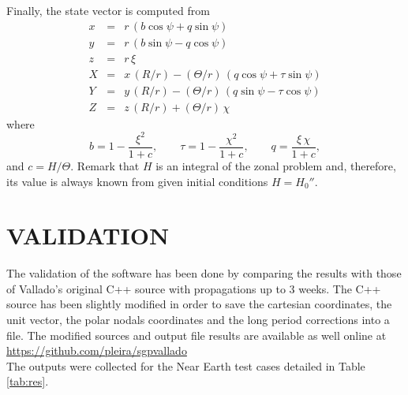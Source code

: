 \documentclass{article}
\begin{document}
Finally, the state vector is computed from
\begin{eqnarray*} \label{eq:ns2x}
x &=& r\,(b\cos\psi+q\sin\psi) \\ \label{eq:ns2y}
y &=& r\,(b\sin\psi-q\cos\psi) \\
z &=& r\,\xi \\
X &=& x\,(R/r) %
 - ({\Theta}/{r})\,(q\cos\psi+\tau\sin\psi) \\ \label{eq:ns2Y}
Y &=& y\,(R/r) %
 - ({\Theta}/{r})\,(q\sin\psi-\tau\cos\psi) \\  \label{eq:ns2zz}
Z &=& z\,(R/r)+(\Theta/r)\,\chi
\end{eqnarray*}
where
\[%
b=1-\frac{\xi^2}{1+c}, \qquad
\tau=1 - \frac{\chi^2}{1 + c}, \qquad
q=\frac{\xi\,\chi}{1+c},
\]%
and $c=H/\Theta$. Remark that $H$ is an integral of the zonal problem and, therefore, its value is always known from given initial conditions $H=H_0''$.



\section{VALIDATION}
\label{sec:validation}

The validation of the software has been done by comparing the results with those
of Vallado's original C++ source with propagations up to 3 weeks. The C++ source has been slightly modified in order
to save the cartesian coordinates, the unit vector, the polar nodals coordinates
and the long period corrections into a file. The modified sources and output file results are available as
well online at \\
\url{https://github.com/pleira/sgpvallado} \\
The outputs were collected for the Near Earth test cases detailed in Table \ref{tab:res}.
\end{document}
